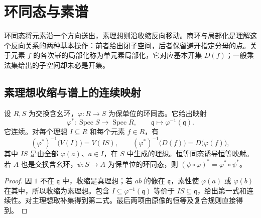 
\section{环同态与素谱}
\label{b3:sec:0104}

环同态将元素沿一个方向送出，素理想则沿收缩反向移动。商环与局部化是理解这个反向关系的两种基本操作：前者给出闭子空间，后者保留避开指定分母的点。关于元素 \(f\) 的各次幂的局部化称为单元素局部化，它对应基本开集 \(D(f)\)；一般乘法集给出的子空间却未必是开集。

\subsection{素理想收缩与谱上的连续映射}
\label{b3:subsec:0104:01}

\begin{samepage}
	\begin{proposition}\label{b3:prop:spectrum-functor}
		设 \(R,S\) 为交换含幺环，\(\varphi:R\rightarrow S\) 为保单位的环同态。它给出映射
		\[
			\varphi^*:\operatorname{Spec}S\longrightarrow\operatorname{Spec}R, \qquad\mathfrak q\longmapsto\varphi^{-1}(\mathfrak q).
		\]
		它连续。对每个理想 \(I\subseteq R\) 和每个元素 \(f\in R\)，有
		\begin{equation}\label{b3:eq:spectrum-pullback}
			(\varphi^*)^{-1}\bigl(V(I)\bigr)=V(IS),\qquad (\varphi^*)^{-1}\bigl(D(f)\bigr)=D\bigl(\varphi(f)\bigr),
		\end{equation}
		其中 \(IS\) 是由全部 \(\varphi(a)\)、\(a\in I\)，在 \(S\) 中生成的理想。恒等同态诱导恒等映射。若 \(A\) 也是交换含幺环，\(\psi:S\rightarrow A\) 为保单位的环同态，则 \((\psi\circ\varphi)^*=\varphi^*\circ\psi^*\)。
	\end{proposition}
\end{samepage}
\begin{proof}
	因 \(1\) 不在 \(\mathfrak q\) 中，收缩是真理想；若 \(ab\) 的像在 \(\mathfrak q\)，素性使 \(\varphi(a)\) 或 \(\varphi(b)\) 在其中，所以收缩为素理想。包含 \(I\subseteq\varphi^{-1}(\mathfrak q)\) 等价于 \(IS\subseteq\mathfrak q\)，给出第一式和连续性。对主理想取补集得到第二式。最后两项由原像的恒等及复合规则直接得到。
\end{proof}


